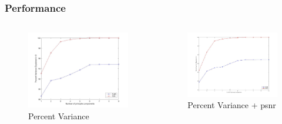 \documentclass{beamer}
\begin{document}
\begin{frame}
\frametitle{Performance}
	\begin{columns}
		\begin{column}{6cm}
			\begin{figure}
				\includegraphics[scale=0.16]{images/PCs} 
				\caption{Percent Variance}
			\end{figure}
		\end{column}
		\begin{column}{6cm}
			\begin{figure}
				\includegraphics[scale=0.2]{images/PCs+psnr} 
				\caption{Percent Variance + psnr}
			\end{figure}
		\end{column}
	\end{columns}
\end{frame} 
\end{document}
